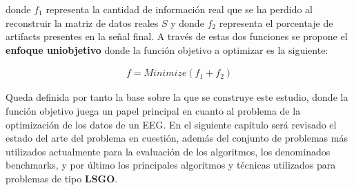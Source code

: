  donde $f_1$ representa la cantidad de información real que se ha perdido al reconstruir la matriz de datos reales $S$ y donde $f_2$ representa el porcentaje de artifacts presentes en la señal final. A través de estas dos funciones se propone el  \textbf{enfoque uniobjetivo} donde la función objetivo a optimizar es la siguiente:
 
 \begin{equation} \label{eq:FObj}
	 \begin{gathered}
	 	f = Minimize(f_1 + f_2)
	 \end{gathered}
 \end{equation}
 
 Queda definida por tanto la base sobre la que se construye este estudio, donde la función objetivo juega un papel principal en cuanto al problema de la optimización de los datos de un EEG. En el siguiente capítulo será revisado el estado del arte del problema en cuestión, además del conjunto de problemas más utilizados actualmente para la evaluación de los algoritmos, los denominados benchmarks, y por último los principales algoritmos y técnicas utilizados para problemas de tipo \textbf{LSGO}.